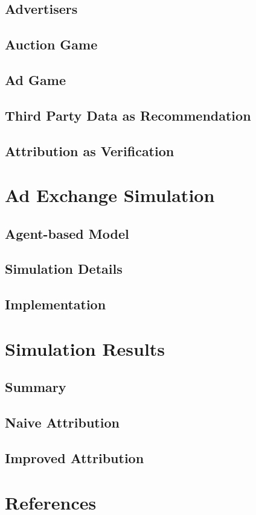 \documentclass{article}
\begin{document}
\subsection{Advertisers}

\subsection{Auction Game}

\subsection{Ad Game}

\subsection{Third Party Data as Recommendation}

\subsection{Attribution as Verification}

\newpage

\section{Ad Exchange Simulation}

\subsection{Agent-based Model}

\subsection{Simulation Details}

\subsection{Implementation}

\newpage

\section{Simulation Results}

\subsection{Summary}

\subsection{Naive Attribution}

\subsection{Improved Attribution}

\section{References}



\end{document}
